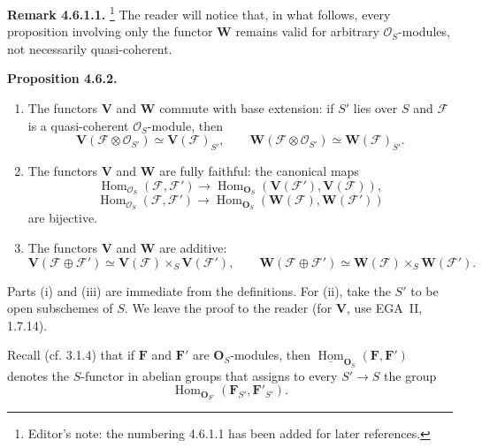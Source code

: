 \medskip
\noindent\textbf{Remark 4.6.1.1.}
\footnote{Editor's note: the numbering 4.6.1.1 has been added for later
references.}
The reader will notice that, in what follows, every proposition involving
only the functor \(\mathbf W\) remains valid for arbitrary
\(\mathcal O_S\)-modules, not necessarily quasi-coherent.

\medskip
\noindent\textbf{Proposition 4.6.2.}
\begin{enumerate}
  \item[(i)]
  The functors \(\mathbf V\) and \(\mathbf W\) commute with base
  extension: if \(S'\) lies over \(S\) and \(\mathscr F\) is a
  quasi-coherent \(\mathcal O_S\)-module, then
  \[
    \mathbf V(\mathscr F\otimes\mathcal O_{S'})
      \simeq\mathbf V(\mathscr F)_{S'},
    \qquad
    \mathbf W(\mathscr F\otimes\mathcal O_{S'})
      \simeq\mathbf W(\mathscr F)_{S'}.
  \]

  \item[(ii)]
  The functors \(\mathbf V\) and \(\mathbf W\) are fully faithful: the
  canonical maps
  \[
    \operatorname{Hom}_{\mathcal O_S}(\mathscr F,\mathscr F')
      \longrightarrow
    \operatorname{Hom}_{\mathbf O_S}
      (\mathbf V(\mathscr F'),\mathbf V(\mathscr F)),
  \]
  \[
    \operatorname{Hom}_{\mathcal O_S}(\mathscr F,\mathscr F')
      \longrightarrow
    \operatorname{Hom}_{\mathbf O_S}
      (\mathbf W(\mathscr F),\mathbf W(\mathscr F'))
  \]
  are bijective.

  \item[(iii)]
  The functors \(\mathbf V\) and \(\mathbf W\) are additive:
  \[
    \mathbf V(\mathscr F\oplus\mathscr F')
      \simeq
    \mathbf V(\mathscr F)\times_S\mathbf V(\mathscr F'),
    \qquad
    \mathbf W(\mathscr F\oplus\mathscr F')
      \simeq
    \mathbf W(\mathscr F)\times_S\mathbf W(\mathscr F').
  \]
\end{enumerate}

Parts (i) and (iii) are immediate from the definitions. For (ii), take
the \(S'\) to be open subschemes of \(S\). We leave the proof to the
reader (for \(\mathbf V\), use EGA~II, 1.7.14).

Recall (cf. 3.1.4) that if \(\mathbf F\) and \(\mathbf F'\) are
\(\mathbf O_S\)-modules, then
\(\underline{\operatorname{Hom}}_{\mathbf O_S}(\mathbf F,\mathbf F')\)
denotes the \(S\)-functor in abelian groups that assigns to every
\(S'\to S\) the group
\[
  \operatorname{Hom}_{\mathbf O_{S'}}(\mathbf F_{S'},\mathbf F'_{S'}).
\]

